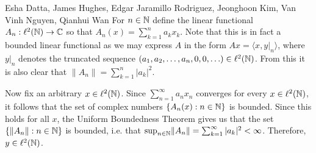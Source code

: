 

\begin{solution}{Esha Datta, James Hughes, Edgar Jaramillo Rodriguez, Jeonghoon Kim, Van Vinh Nguyen, Qianhui Wan}
        For $n\in \mathbb{N}$ define the linear functional $A_n : \ell^2(\mathbb{N})\to \mathbb{C}$ so that $A_n(x) = \sum_{k=1}^na_kx_k $.
        Note that this is in fact a bounded linear functional as we may express $A$ in the form $Ax = \langle x, y|_n \rangle$, where $y|_n$ denotes the truncated sequence $(a_1, a_2, \ldots, a_n, 0,0, \ldots) \in \ell^2(\mathbb{N})$.
        From this it is also clear that $\lVert A_n \rVert = \sum_{k=1}^n |a_k|^2$. 

        Now fix an arbitrary $x\in \ell^2(\mathbb{N})$.
        Since $\sum_{n=1}^\infty a_n x_n$ converges for every $x \in \ell^2(\mathbb{N})$, it follows that the set of complex numbers $\{A_n(x): n\in\mathbb{N} \}$ is bounded.
        Since this holds for all $x$, the Uniform Boundedness Theorem gives us that the set $\{\lVert A_n \rVert:n\in \mathbb{N}\}$ is bounded, i.e. that $\sup_{n\in\mathbb{N}}\lVert A_n \rVert = \sum_{k=1}^\infty |a_k|^2 < \infty$.
        Therefore, $y\in \ell^2(\mathbb{N})$.
\end{solution}

